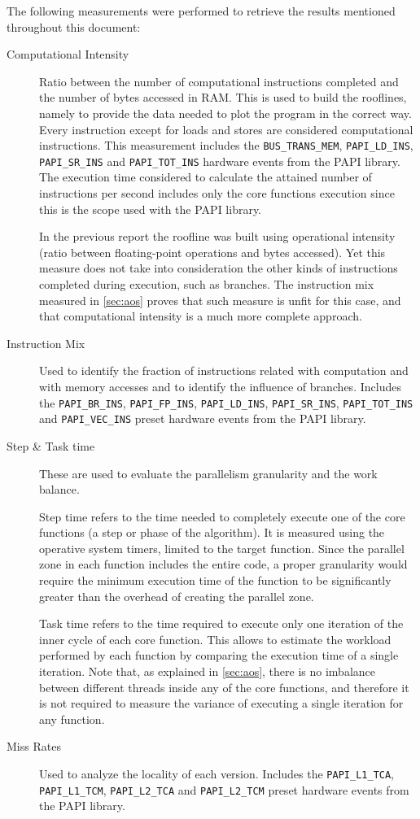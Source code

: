 \documentclass[abstract=on,9pt,twocolumn]{scrartcl}
\begin{document}
The following measurements were performed to retrieve the results mentioned throughout this document:
\begin{description}
	\item[Computational Intensity]{Ratio between the number of computational instructions completed and the number of bytes accessed in RAM. This is used to build the rooflines, namely to provide the data needed to plot the program in the correct way. Every instruction except for loads and stores are considered computational instructions. This measurement includes the \texttt{BUS\_TRANS\_MEM}, \texttt{PAPI\_LD\_INS}, \texttt{PAPI\_SR\_INS} and \texttt{PAPI\_TOT\_INS} hardware events from the PAPI library. The execution time considered to calculate the attained number of instructions per second includes only the core functions execution since this is the scope used with the PAPI library.
	
	In the previous report the roofline was built using operational intensity (ratio between floating-point operations and bytes accessed). Yet this measure does not take into consideration the other kinds of instructions completed during execution, such as branches. The instruction mix measured in \cref{sec:aos} proves that such measure is unfit for this case, and that computational intensity is a much more complete approach.
	}
	\item[Instruction Mix]{Used to identify the fraction of instructions related with computation and with memory accesses and to identify the influence of branches. Includes the \texttt{PAPI\_BR\_INS}, \texttt{PAPI\_FP\_INS}, \texttt{PAPI\_LD\_INS}, \texttt{PAPI\_SR\_INS}, \texttt{PAPI\_TOT\_INS} and \texttt{PAPI\_VEC\_INS} preset hardware events from the PAPI library.
	}
	\item[Step \& Task time]{These are used to evaluate the parallelism granularity and the work balance.
	
	Step time refers to the time needed to completely execute one of the core functions (a step or phase of the algorithm). It is measured using the operative system timers, limited to the target function. Since the parallel zone in each function includes the entire code, a proper granularity would require the minimum execution time of the function to be significantly greater than the overhead of creating the parallel zone.
	
	Task time refers to the time required to execute only one iteration of the inner cycle of each core function. This allows to estimate the workload performed by each function by comparing the execution time of a single iteration. Note that, as explained in \cref{sec:aos}, there is no imbalance between different threads inside any of the core functions, and therefore it is not required to measure the variance of executing a single iteration for any function.
	}
	\item[Miss Rates]{Used to analyze the locality of each version. Includes the \texttt{PAPI\_L1\_TCA}, \texttt{PAPI\_L1\_TCM}, \texttt{PAPI\_L2\_TCA} and \texttt{PAPI\_L2\_TCM} preset hardware events from the PAPI library.
	}
\end{description}
\end{document}
